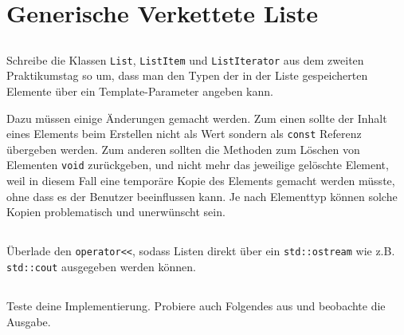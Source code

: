 \section{Generische Verkettete Liste}
\label{sec:list}
\subsection{}
Schreibe die Klassen \lstinline{List}, \lstinline{ListItem} und \lstinline{ListIterator} aus dem zweiten Praktikumstag so um, dass man den Typen der in der Liste gespeicherten Elemente über ein Template-Parameter angeben kann.

Dazu müssen einige Änderungen gemacht werden.
Zum einen sollte der Inhalt eines Elements beim Erstellen nicht als Wert sondern als \lstinline{const} Referenz übergeben werden.
Zum anderen sollten die Methoden zum Löschen von Elementen \lstinline{void} zurückgeben, und nicht mehr das jeweilige gelöschte Element, weil in diesem Fall eine temporäre Kopie des Elements gemacht werden müsste, ohne dass es der Benutzer beeinflussen kann.
Je nach Elementtyp können solche Kopien problematisch und unerwünscht sein.


\subsection{}
Überlade den \lstinline{operator<<}, sodass Listen direkt über ein \lstinline{std::ostream} wie z.B. \lstinline{std::cout} ausgegeben werden können.

\subsection{}
Teste deine Implementierung.
Probiere auch Folgendes aus und beobachte die Ausgabe.



